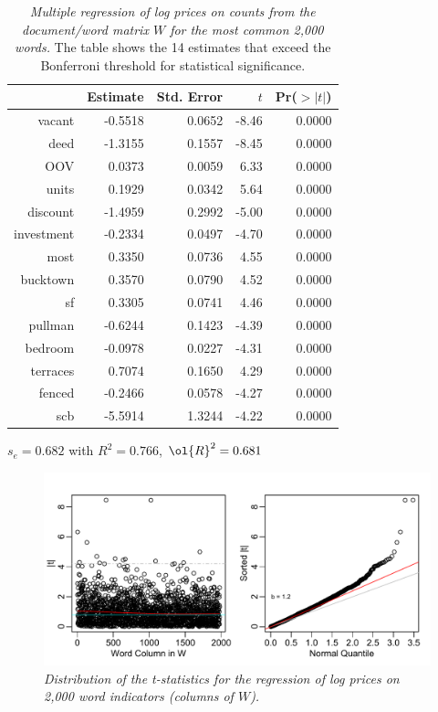 \documentclass[12pt]{article}
\begin{document}
 \begin{table}
 \caption{ \label{tab:regrInd} {\sl Multiple regression of log prices on 
  counts from the document/word matrix $W$ for the most common 2,000 words.}  The table shows the 14 estimates that exceed the Bonferroni threshold for statistical significance.} 

\begin{center}
\begin{tabular}{rrrrr}
  \hline
 & Estimate & Std. Error & $t$ & Pr($>|t|$) \\ 
  \hline
  vacant & -0.5518 & 0.0652 & -8.46 & 0.0000 \\ 
  deed & -1.3155 & 0.1557 & -8.45 & 0.0000 \\ 
  OOV & 0.0373 & 0.0059 & 6.33 & 0.0000 \\ 
  units & 0.1929 & 0.0342 & 5.64 & 0.0000 \\ 
  discount & -1.4959 & 0.2992 & -5.00 & 0.0000 \\ 
  investment & -0.2334 & 0.0497 & -4.70 & 0.0000 \\ 
  most & 0.3350 & 0.0736 & 4.55 & 0.0000 \\ 
  bucktown & 0.3570 & 0.0790 & 4.52 & 0.0000 \\ 
  sf & 0.3305 & 0.0741 & 4.46 & 0.0000 \\ 
  pullman & -0.6244 & 0.1423 & -4.39 & 0.0000 \\ 
  bedroom & -0.0978 & 0.0227 & -4.31 & 0.0000 \\ 
  terraces & 0.7074 & 0.1650 & 4.29 & 0.0000 \\ 
  fenced & -0.2466 & 0.0578 & -4.27 & 0.0000 \\ 
  scb & -5.5914 & 1.3244 & -4.22 & 0.0000 \\ 
 \hline
\end{tabular}
 
    $s_e =  0.682$ with $R^2 =  0.766$, $\ol{R}^2 =  0.681$  
\end{center}
\end{table}



 \begin{figure}
  \caption{ \label{fig:regrInd} { \sl Distribution of the t-statistics for the regression of log prices on 2,000 word indicators (columns of $W$).}}
 \centerline{  \includegraphics[width=6in]{figures/tstatRegrInd}    }
 \vspace{0.2in}
 \end{figure}
\end{document}
